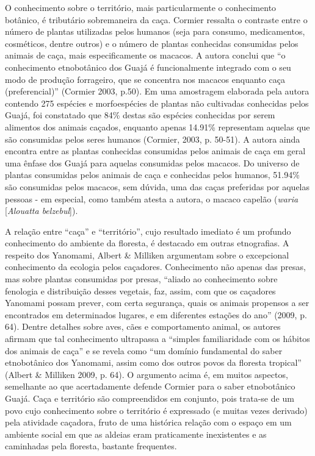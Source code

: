O conhecimento sobre o território, mais particularmente o conhecimento
botânico, é tributário sobremaneira da caça. Cormier ressalta o
contraste entre o número de plantas utilizadas pelos humanos (seja para
consumo, medicamentos, cosméticos, dentre outros) e o número de plantas
conhecidas consumidas pelos animais de caça, mais especificamente os
macacos. A autora conclui que ``o conhecimento etnobotânico dos Guajá é
funcionalmente integrado com o seu modo de produção forrageiro, que se
concentra nos macacos enquanto caça (preferencial)'' (Cormier 2003,
p.50). Em uma amostragem elaborada pela autora contendo 275 espécies e
morfoespécies de plantas não cultivadas conhecidas pelos Guajá, foi
constatado que 84\% destas são espécies conhecidas por serem alimentos
dos animais caçados, enquanto apenas 14.91\% representam aquelas que são
consumidas pelos seres humanos (Cormier, 2003, p. 50-51). A autora ainda
encontra entre as plantas conhecidas consumidas pelos animais de caça em
geral uma ênfase dos Guajá para aquelas consumidas pelos macacos. Do
universo de plantas consumidas pelos animais de caça e conhecidas pelos
humanos, 51.94\% são consumidas pelos macacos, sem dúvida, uma das caças
preferidas por aquelas pessoas - em especial, como também atesta a
autora, o macaco capelão (\emph{waria} {[}\emph{Alouatta belzebul}{]}).

A relação entre ``caça'' e ``território'', cujo resultado imediato é um
profundo conhecimento do ambiente da floresta, é destacado em outras
etnografias. A respeito dos Yanomami, Albert \& Milliken argumentam
sobre o excepcional conhecimento da ecologia pelos caçadores.
Conhecimento não apenas das presas, mas sobre plantas consumidas por
presas, ``aliado ao conhecimento sobre fenologia e distribuição desses
vegetais, faz, assim, com que os caçadores Yanomami possam prever, com
certa segurança, quais os animais propensos a ser encontrados em
determinados lugares, e em diferentes estações do ano'' (2009, p. 64).
Dentre detalhes sobre aves, cães e comportamento animal, os autores
afirmam que tal conhecimento ultrapassa a ``simples familiaridade com os
hábitos dos animais de caça'' e se revela como ``um domínio fundamental
do saber etnobotânico dos Yanomami, assim como dos outros povos da
floresta tropical'' (Albert \& Milliken 2009, p. 64). O argumento acima
é, em muitos aspectos, semelhante ao que acertadamente defende Cormier
para o saber etnobotânico Guajá. Caça e território são compreendidos em
conjunto, pois trata-se de um povo cujo conhecimento sobre o território
é expressado (e muitas vezes derivado) pela atividade caçadora, fruto de
uma histórica relação com o espaço em um ambiente social em que as
aldeias eram praticamente inexistentes e as caminhadas pela floresta,
bastante frequentes.

